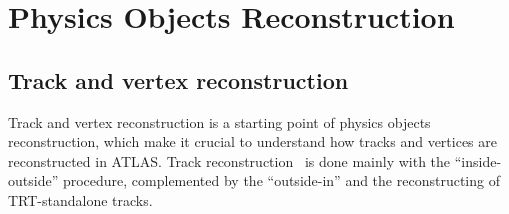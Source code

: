 \chapter{Physics Objects Reconstruction}
\section{Track and vertex reconstruction}
\label{sec:track}
Track and vertex reconstruction is a starting point of physics objects reconstruction, 
which make it crucial to understand how tracks and vertices are reconstructed in ATLAS.
Track reconstruction~\cite{ATLAS-CONF-2012-042,PERF-2015-08} is done 
mainly with the ``inside-outside'' procedure, complemented by the ``outside-in'' 
and the reconstructing of TRT-standalone tracks. 

